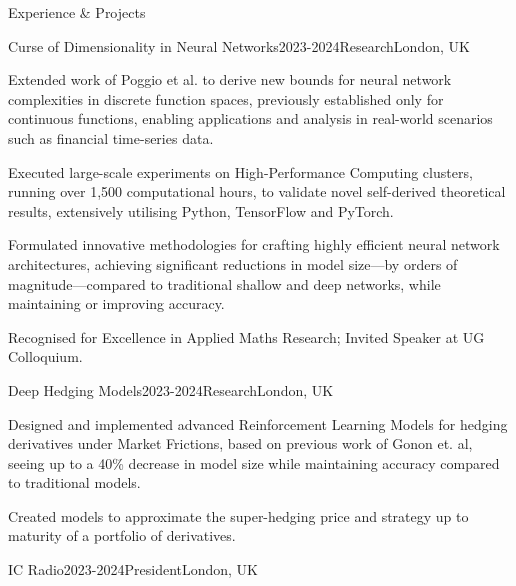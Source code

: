 \documentclass{resume} %
\begin{document}
\begin{rSection}{Experience \& Projects}

\begin{rSubsection}{Curse of Dimensionality in Neural Networks}{2023-2024}{Research}{London, UK}
\item Extended work of Poggio et al. to derive new bounds for neural network complexities in discrete function spaces, previously established only for continuous functions, enabling applications and analysis in real-world scenarios such as financial time-series data.
\item Executed large-scale experiments on High-Performance Computing clusters, running over 1,500 computational hours, to validate novel self-derived theoretical results, extensively utilising Python, TensorFlow and PyTorch.
\item Formulated innovative methodologies for crafting highly efficient neural network architectures, achieving significant reductions in model size—by orders of magnitude—compared to traditional shallow and deep networks, while maintaining or improving accuracy.
\item Recognised for Excellence in Applied Maths Research; Invited Speaker at UG Colloquium.
\end{rSubsection}

\begin{rSubsection}{Deep Hedging Models}{2023-2024}{Research}{London, UK}
    \item Designed and implemented advanced Reinforcement Learning Models for hedging derivatives under Market Frictions, based on previous work of Gonon et. al, seeing up to a 40\% decrease in model size while maintaining accuracy compared to traditional models.
    \item Created models to approximate the super-hedging price and strategy up to maturity of a portfolio of derivatives.
\end{rSubsection}


\begin{rSubsection}{IC Radio}{2023-2024}{President}{London, UK}


\end{rSubsection}
\end{rSection}
\end{document}

